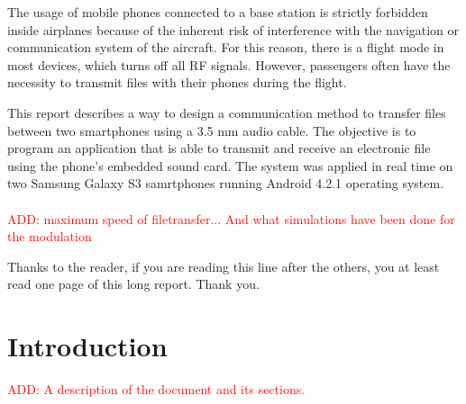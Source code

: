 \documentclass[12pt,a4paper,openright]{report}
\renewenvironment{abstract}
  {\small\quotation
  {\bfseries\noindent{\large\abstractname}\par\nobreak\smallskip}}
  {\endquotation}
\begin{document}
\begin{abstract}

The usage of mobile phones connected to a base station is strictly forbidden inside airplanes because of the inherent risk of interference with the navigation or communication system of the aircraft. For this reason, there is a flight mode in most devices, which turns off all RF signals. However, passengers often have the necessity to transmit files with their phones during the flight.

This report describes a way to design a communication method to transfer files between two smartphones using a 3.5 mm audio cable. The objective is to program an application that is able to transmit and receive an electronic file using the phone's embedded sound card. The system was applied in real time on two Samsung Galaxy S3 samrtphones running Android 4.2.1 operating system. 
\\
\\
\textcolor{red}{ADD: maximum speed of filetransfer... And what simulations have been done for the modulation}


\end{abstract}

\clearpage

{\hypersetup{hidelinks}\tableofcontents}
{\hypersetup{hidelinks}\listoffigures}
{\hypersetup{hidelinks}\listoftables}
%



\clearpage

\newpage\null\thispagestyle{empty}\newpage

\renewcommand{\abstractname}{Acknowledgements}
\begin{abstract}
 Thanks to the reader, if you are reading this line after the others, you at least read one page of this long report. Thank you.
\end{abstract}

\clearpage





\chapter{Introduction}
\textcolor{red}{ADD: A description of the document and its sections.}
\end{document}

